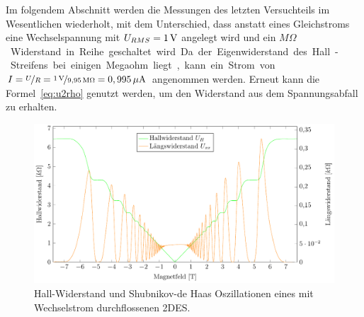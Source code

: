 
Im folgendem Abschnitt werden die Messungen des letzten Versuchteils im Wesentlichen wiederholt, mit dem Unterschied, dass anstatt eines Gleichstroms eine Wechselspannung %
 mit $U_{RMS}=\unit[1]{V}$ angelegt wird und ein \unit[9,95]{$M\Omega$} Widerstand in Reihe geschaltet wird. Da der Eigenwiderstand des Hall-Streifens bei einigen Megaohm liegt, kann ein Strom von $I=\nicefrac{U}{R}=\nicefrac{\unit[1]{V}}{\unit[9,95]{M\Omega}}=\unit[0,995]{\mu A}$ angenommen werden. Erneut kann die Formel~\eqref{eq:u2rho} genutzt werden, um den Widerstand aus dem Spannungsabfall zu erhalten.



\begin{figure}[h]
	\centering
	\includegraphics{graphs/ac/full_range.pdf}
	\caption[Gleichstrommessung im maximalen Magnetfeldbereich]{
		Hall-Widerstand und Shubnikov-de Haas Oszillationen eines mit Wechselstrom durchflossenen 2DES.
	}
	\label{fig:full_range_ac}
\end{figure}